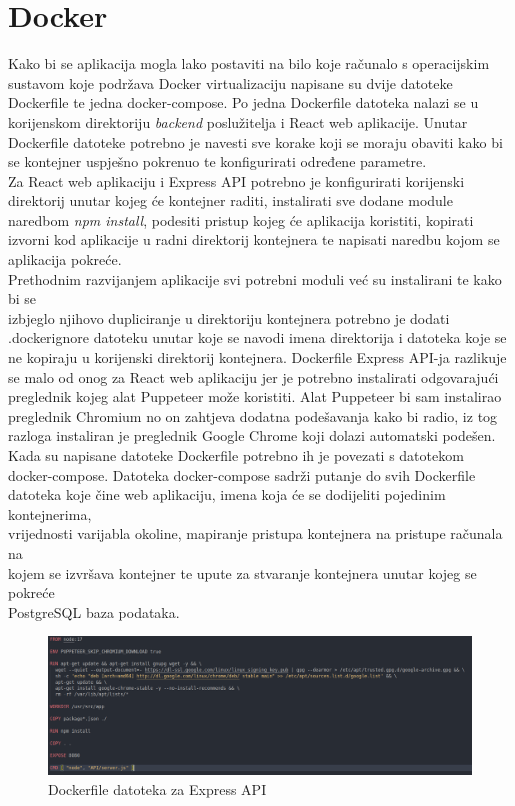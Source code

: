 \documentclass[times, utf8, zavrsni]{fer}
\begin{document}
\section{Docker}
Kako bi se aplikacija mogla lako postaviti na bilo koje računalo s operacijskim \\sustavom koje podržava Docker virtualizaciju napisane su 
dvije datoteke Dockerfile te jedna docker-compose. Po jedna Dockerfile datoteka nalazi se u korijenskom direktoriju \emph{backend} poslužitelja i 
React web aplikacije. Unutar Dockerfile datoteke potrebno je navesti sve korake koji se moraju obaviti kako bi se kontejner uspješno pokrenuo te konfigurirati
određene parametre.
\\Za React web aplikaciju i Express API potrebno je konfigurirati korijenski direktorij unutar kojeg će kontejner raditi, instalirati sve dodane module naredbom \emph{npm install}, 
podesiti pristup  kojeg će aplikacija koristiti, kopirati izvorni kod aplikacije u radni direktorij kontejnera te napisati naredbu kojom se 
aplikacija pokreće. \\Prethodnim razvijanjem aplikacije svi potrebni moduli već su instalirani te kako bi se\\izbjeglo njihovo dupliciranje u direktoriju kontejnera potrebno je dodati 
.dockerignore datoteku unutar koje se navodi imena direktorija i datoteka koje se ne kopiraju u korijenski direktorij kontejnera.
Dockerfile Express API-ja razlikuje se malo od onog za React web aplikaciju jer je potrebno instalirati odgovarajući preglednik kojeg alat Puppeteer može koristiti.
Alat Puppeteer bi sam instalirao preglednik Chromium no on zahtjeva dodatna podešavanja kako bi radio, iz tog razloga instaliran je preglednik Google Chrome koji 
dolazi automatski podešen.
\\Kada su napisane datoteke Dockerfile potrebno ih je povezati s datotekom \\docker-compose. Datoteka docker-compose sadrži putanje do svih Dockerfile datoteka koje 
čine web aplikaciju, imena koja će se dodijeliti pojedinim kontejnerima, \\vrijednosti varijabla okoline, mapiranje pristupa kontejnera na pristupe računala na \\kojem se izvršava kontejner te
upute za stvaranje kontejnera unutar kojeg se pokreće \\PostgreSQL baza podataka.
\begin{figure}[htb]
    \hspace*{-2cm}
       \includegraphics[scale=0.33]{dockerfile.png} 
       \caption{Dockerfile datoteka za Express API}
       \label{fig:docker1}
       \end{figure}
\end{document}
